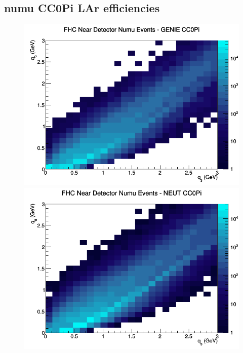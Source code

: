 \subsection{numu CC0Pi LAr efficiencies}
\begin{figure}[h]
\includegraphics[width=\linewidth]{eff_q0_q3/LAr/CC0Pi_FHC_ND_numu_q3_q0_GENIE.png}
\endminipage
{}
\includegraphics[width=\linewidth]{eff_q0_q3/LAr/CC0Pi_FHC_ND_numu_q3_q0_NEUT.png}
\endminipage
{}

\end{figure}
